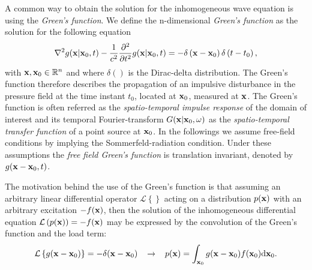 \vspace{3mm}
A common way to obtain the solution for the inhomogeneous wave equation is using the \emph{Green's function}. We define the n-dimensional \emph{Green's function} as the solution for the following equation \cite{Gumerov2004, Williams1999}
\begin{equation}
\nabla^2 g(\mathbf{x}|\mathbf{x}_0,t) -\frac{1}{c^2}\frac{\partial^2}{\partial t^2} g(\mathbf{x}|\mathbf{x}_0,t) = -\delta\left( \mathbf{x} - \mathbf{x}_0 \right)\delta\left( t - t_0 \right),
\label{Eq:Theory:Green_function_def}
\end{equation}
with $\mathbf{x}, \mathbf{x}_0 \in \mathbb{R}^{n}$ and where $\delta()$ is the Dirac-delta distribution. The Green's function therefore describes the propagation of an impulsive disturbance in the pressure field at the time instant $t_0$, located at $\mathbf{x}_0$, measured at $\mathbf{x}$. The Green's function is often referred as the \emph{spatio-temporal impulse response} of the domain of interest and its temporal Fourier-transform $G(\mathbf{x}|\mathbf{x}_0,\omega)$ as the \emph{spatio-temporal transfer function} of a point source at $\mathbf{x}_0$. In the followings we assume free-field conditions by implying the Sommerfeld-radiation condition. Under these assumptions the \emph{free field Green's function} is translation invariant, denoted by $g(\mathbf{x}-\mathbf{x}_0,t)$.

The motivation behind the use of the Green's function is that assuming an arbitrary linear differential operator $\mathcal{L}\left\{ \right\}$ acting on a distribution $p(\mathbf{x})$ with an arbitrary excitation $-f(\mathbf{x})$, then the solution of the inhomogeneous differential equation $\mathcal{L}\left(p(\mathbf{x})\right) = -f(\mathbf{x})$ may be expressed by the convolution of the Green's function and the load term:
\begin{equation}
\mathcal{L}\left\{ g(\mathbf{x}-\mathbf{x}_0) \right\} = -\delta( \mathbf{x}-\mathbf{x}_0 ) \hspace{3mm} \rightarrow \hspace{3mm}
p(\mathbf{x}) = \int_{\mathbf{x}_0 }  g(\mathbf{x}-\mathbf{x}_0) f(\mathbf{x}_0) \mathrm{d} \mathbf{x}_0.
\label{Eq:Theory:Basic_Green_function_eq}
\end{equation}

